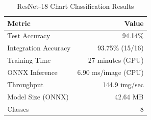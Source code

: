 \begin{table}[htbp]
\centering
\caption{ResNet-18 Chart Classification Results}
\label{tab:resnet-results}
\begin{tabular}{@{}lr@{}}
\toprule
\textbf{Metric} & \textbf{Value} \\
\midrule
Test Accuracy       & 94.14\% \\
Integration Accuracy & 93.75\% (15/16) \\
Training Time       & 27 minutes (GPU) \\
ONNX Inference      & 6.90 ms/image (CPU) \\
Throughput          & 144.9 img/sec \\
Model Size (ONNX)   & 42.64 MB \\
Classes             & 8 \\
\bottomrule
\end{tabular}
\end{table}